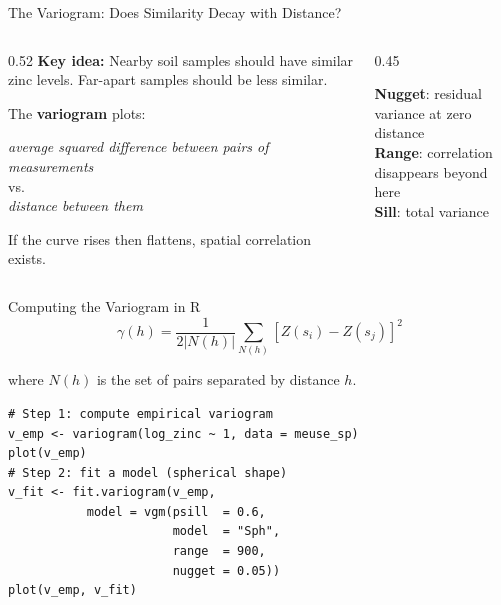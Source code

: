 \documentclass[aspectratio=169, 12pt]{beamer}
\begin{document}
\begin{frame}{The Variogram: Does Similarity Decay with Distance?}
  \begin{columns}[c]
    \begin{column}{0.52\textwidth}
      \textbf{Key idea:} Nearby soil samples should have similar zinc levels. Far-apart samples should be less similar.
      \vspace{0.5em}

      The \textbf{variogram} plots:
      \begin{center}
        \textit{average squared difference between pairs of measurements}\\
        vs.\\
        \textit{distance between them}
      \end{center}
      If the curve rises then flattens, spatial correlation exists.
    \end{column}
    \begin{column}{0.45\textwidth}
      \vspace{0.3em}
      \footnotesize
      \textbf{Nugget}: residual variance at zero distance\\
      \textbf{Range}: correlation disappears beyond here\\
      \textbf{Sill}: total variance
    \end{column}
  \end{columns}
\end{frame}


\begin{frame}[fragile]{Computing the Variogram in R}
\vspace{-.3em}
$$\gamma(h) = \frac{1}{2|N(h)|} \sum_{N(h)} [Z(s_i) - Z(s_j)]^2$$

where $N(h)$ is the set of pairs separated by distance $h$.

\begin{lstlisting}
# Step 1: compute empirical variogram
v_emp <- variogram(log_zinc ~ 1, data = meuse_sp)
plot(v_emp)
# Step 2: fit a model (spherical shape)
v_fit <- fit.variogram(v_emp,
           model = vgm(psill  = 0.6,
                       model  = "Sph",
                       range  = 900,
                       nugget = 0.05))
plot(v_emp, v_fit)
\end{lstlisting}
\end{frame}
\end{document}
